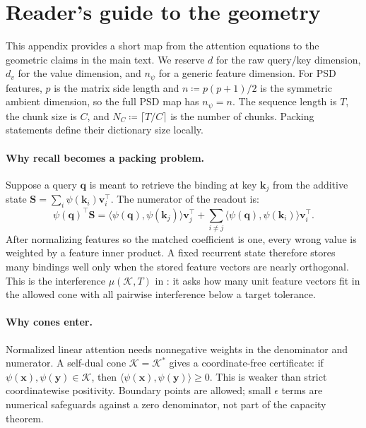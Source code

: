 \documentclass{article}
\newcommand{\1}{\bm{1}}
\newcommand{\defeq}{\coloneqq}
\newcommand{\lrangle}[1]{\langle#1\rangle}
\def\eps{{\epsilon}}
\def\vk{{\bm{k}}}
\def\vq{{\bm{q}}}
\def\vv{{\bm{v}}}
\def\vx{{\bm{x}}}
\def\vy{{\bm{y}}}
\def\mS{{\bm{S}}}
\def\gK{{\mathcal{K}}}
\newcommand{\seql}{T}
\theoremstyle{definition}
\begin{document}



\newpage
\appendix
\thispagestyle{empty}
\section{Reader's guide to the geometry}
\label{app:reader-guide}

This appendix provides a short map from the attention equations to the geometric claims in the
main text. We reserve $d$ for the raw query/key dimension, $d_v$ for the value dimension, and
$n_\psi$ for a generic feature dimension. For PSD features, $p$ is the matrix side length and
$n\defeq p(p+1)/2$ is the symmetric ambient dimension, so the full PSD map has $n_\psi=n$.
The sequence length is $\seql$, the chunk size is $C$, and
$N_C\defeq\lceil \seql/C\rceil$ is the number of chunks. Packing statements define their dictionary
size locally.

\paragraph{Why recall becomes a packing problem.}
Suppose a query $\vq$ is meant to retrieve the binding at key $\vk_j$ from the additive state
$\mS=\sum_i \psi(\vk_i)\vv_i^\top$. The numerator of the readout is:
\[
  \psi(\vq)^\top \mS
  =
  \lrangle{\psi(\vq),\psi(\vk_j)}\vv_j^\top
  +
  \sum_{i\ne j}\lrangle{\psi(\vq),\psi(\vk_i)}\vv_i^\top .
\]
After normalizing features so the matched coefficient is one, every wrong value is weighted by a
feature inner product. A fixed recurrent state therefore stores many bindings well only when the
stored feature vectors are nearly orthogonal. This is the interference $\mu(\gK,T)$ in
: it asks how many unit feature vectors fit in the allowed cone with all pairwise
interference below a target tolerance.

\paragraph{Why cones enter.}
Normalized linear attention needs nonnegative weights in the denominator and numerator. A self-dual
cone $\gK=\gK^*$ gives a coordinate-free certificate: if $\psi(\vx),\psi(\vy)\in\gK$, then
$\lrangle{\psi(\vx),\psi(\vy)}\ge0$. This is weaker than strict coordinatewise positivity. Boundary
points are allowed; small $\eps$ terms are numerical safeguards against a zero denominator, not
part of the capacity theorem.
\end{document}

